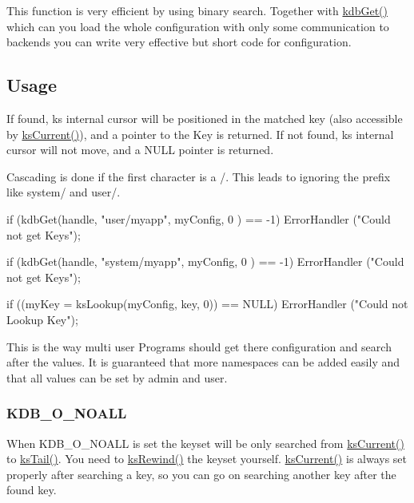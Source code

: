 This function is very efficient by using binary search. Together with \hyperlink{group__kdb_ga28e385fd9cb7ccfe0b2f1ed2f62453a1}{kdbGet()} which can you load the whole configuration with only some communication to backends you can write very effective but short code for configuration.\hypertarget{group__keyset_Usage}{}\subsection{Usage}\label{group__keyset_Usage}
If found, {\ttfamily ks} internal cursor will be positioned in the matched key (also accessible by \hyperlink{group__keyset_ga4287b9416912c5f2ab9c195cb74fb094}{ksCurrent()}), and a pointer to the Key is returned. If not found, {\ttfamily ks} internal cursor will not move, and a NULL pointer is returned.

Cascading is done if the first character is a /. This leads to ignoring the prefix like system/ and user/. 
\begin{DoxyCode}
        if (kdbGet(handle, "user/myapp", myConfig, 0 ) == -1)
                ErrorHandler ("Could not get Keys");

        if (kdbGet(handle, "system/myapp", myConfig, 0 ) == -1)
                ErrorHandler ("Could not get Keys");

        if ((myKey = ksLookup(myConfig, key, 0)) == NULL)
                ErrorHandler ("Could not Lookup Key");
\end{DoxyCode}


This is the way multi user Programs should get there configuration and search after the values. It is guaranteed that more namespaces can be added easily and that all values can be set by admin and user.\hypertarget{group__keyset_KDB_O_NOALL}{}\subsubsection{KDB\_\-O\_\-NOALL}\label{group__keyset_KDB_O_NOALL}
When KDB\_\-O\_\-NOALL is set the keyset will be only searched from \hyperlink{group__keyset_ga4287b9416912c5f2ab9c195cb74fb094}{ksCurrent()} to \hyperlink{group__keyset_gadca442c4ab43cf532b15091d7711559e}{ksTail()}. You need to \hyperlink{group__keyset_gabe793ff51f1728e3429c84a8a9086b70}{ksRewind()} the keyset yourself. \hyperlink{group__keyset_ga4287b9416912c5f2ab9c195cb74fb094}{ksCurrent()} is always set properly after searching a key, so you can go on searching another key after the found key.

